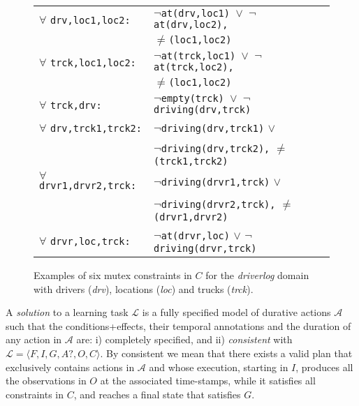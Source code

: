 \documentclass{ecai}
\newcommand{\tup}[1]{{\langle #1 \rangle}}
\begin{document}
\begin{figure}
\begin{scriptsize}
   
\begin{tabular}{p{2.8cm}l}

$\forall$ \texttt{drv,loc1,loc2:} & $\neg$\texttt{at(drv,loc1) $\vee$ $\neg$at(drv,loc2),} \\
& $\neq$\texttt{(loc1,loc2)}\\

$\forall$ \texttt{trck,loc1,loc2:} & $\neg$\texttt{at(trck,loc1) $\vee$ $\neg$at(trck,loc2),} \\
& $\neq$\texttt{(loc1,loc2)}\\

$\forall$ \texttt{trck,drv:} & $\neg$\texttt{empty(trck) $\vee$ $\neg$driving(drv,trck)}\\

$\forall$ \texttt{drv,trck1,trck2:}  & $\neg$\texttt{driving(drv,trck1)} $\vee$\\
& $\neg$\texttt{driving(drv,trck2),} $\neq$\texttt{(trck1,trck2)}\\

$\forall$ \texttt{drvr1,drvr2,trck:}  & $\neg$\texttt{driving(drvr1,trck)} $\vee$\\
& $\neg$\texttt{driving(drvr2,trck),} $\neq$\texttt{(drvr1,drvr2)}\\

$\forall$ \texttt{drvr,loc,trck:} & $\neg$\texttt{at(drvr,loc)} $\vee$ $\neg$\texttt{driving(drvr,trck)}

\end{tabular}  
\end{scriptsize}    
\caption{Examples of six mutex constraints in $C$ for the {\em driverlog} domain with drivers (\textit{drv}), locations (\textit{loc}) and trucks (\textit{trck}).}
\label{fig:example-statecs}
\end{figure}

A {\em solution} to a learning task $\mathcal{L}$ is a fully specified model of durative actions $\mathcal{A}$ such that the conditions+effects, their temporal annotations and the duration of any action in $\mathcal{A}$ are: i) completely specified, and ii) {\em consistent} with $\mathcal{L}=\tup{F,I,G,A?,O,C}$. By consistent we mean that there exists a valid plan that exclusively contains actions in $\mathcal{A}$ and whose execution, starting in $I$, produces all the observations in $O$ at the associated time-stamps, while it satisfies all constraints in $C$, and reaches a final state that satisfies $G$.
\end{document}
